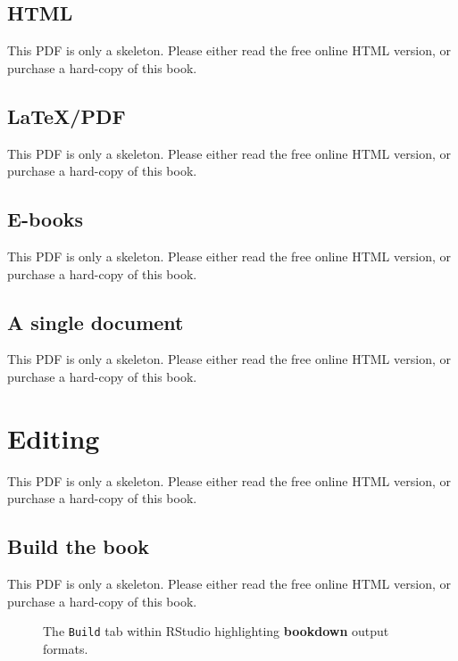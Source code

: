 \documentclass[
  11pt,
]{krantz}
\theoremstyle{definition}
\theoremstyle{definition}
\theoremstyle{definition}
\theoremstyle{definition}
\theoremstyle{remark}
\begin{document}
\subsection{HTML}\label{html}

This PDF is only a skeleton. Please either read the free online HTML version, or purchase a hard-copy of this book.

\subsection{LaTeX/PDF}\label{latexpdf}

This PDF is only a skeleton. Please either read the free online HTML version, or purchase a hard-copy of this book.

\subsection{E-books}\label{e-books}

This PDF is only a skeleton. Please either read the free online HTML version, or purchase a hard-copy of this book.

\subsection{A single document}\label{a-single-document}

This PDF is only a skeleton. Please either read the free online HTML version, or purchase a hard-copy of this book.

\section{Editing}\label{bookdown-edit}

This PDF is only a skeleton. Please either read the free online HTML version, or purchase a hard-copy of this book.

\subsection{Build the book}\label{build-the-book}

This PDF is only a skeleton. Please either read the free online HTML version, or purchase a hard-copy of this book.

\begin{figure}\caption{The \texttt{Build} tab within RStudio highlighting \textbf{bookdown} output formats.}\end{figure}
\end{document}
